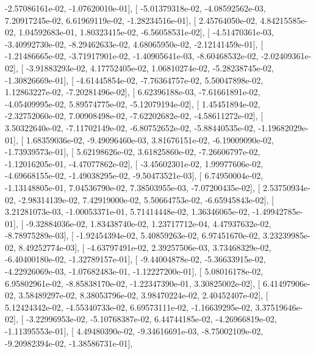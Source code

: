 \documentclass{article}
\begin{document}
         -2.57086161e-02,  -1.07620010e-01],
       [ -5.01379318e-02,  -4.08592562e-03,   7.20917245e-02,
          6.61969119e-02,  -1.28234516e-01],
       [  2.45764050e-02,   4.84215585e-02,   1.04592683e-01,
          1.80323415e-02,  -6.56058531e-02],
       [ -4.51470361e-03,  -3.40992730e-02,  -8.29462633e-02,
          4.68065950e-02,  -2.12141459e-01],
       [ -1.21486665e-02,  -3.71917901e-02,  -1.40905641e-03,
         -8.60468532e-02,  -2.02409361e-02],
       [ -3.91883293e-02,   4.17752405e-02,   1.06810274e-02,
         -5.28238745e-02,  -1.30826669e-01],
       [ -4.61445854e-02,  -7.76364757e-02,   5.50047898e-02,
          1.12863227e-02,  -7.20281496e-02],
       [  6.62396188e-03,  -7.61661891e-02,  -4.05409995e-02,
          5.89574775e-02,  -5.12079194e-02],
       [  1.45451894e-02,  -2.32752060e-02,   7.00908498e-02,
         -7.62202682e-02,  -4.58611272e-02],
       [  3.50322640e-02,  -7.11702149e-02,  -6.80752652e-02,
         -5.88440535e-02,  -1.19682029e-01],
       [  1.68359036e-02,  -9.49096460e-03,   3.81676151e-02,
         -6.19009090e-02,  -1.73939573e-01],
       [  5.62198626e-02,   3.61825860e-02,  -7.26606797e-02,
         -1.12016205e-01,  -4.47077862e-02],
       [ -3.45602301e-02,   1.99977606e-02,  -4.69668155e-02,
         -1.49038295e-02,  -9.50473521e-03],
       [  6.74950004e-02,  -1.13148805e-01,   7.04536790e-02,
          7.38503955e-03,  -7.07200435e-02],
       [  2.53750934e-02,  -2.98314139e-02,   7.42919000e-02,
          5.50664753e-02,  -6.65945843e-02],
       [  3.21281073e-03,  -1.00053371e-01,   5.71414448e-02,
          1.36346065e-02,  -1.49942785e-01],
       [ -9.32884036e-02,   1.83438740e-02,   1.23717712e-04,
          4.47937632e-02,  -8.78975289e-03],
       [ -1.92454394e-02,   5.40859263e-02,   6.97451670e-02,
          3.23239985e-02,   8.49252774e-03],
       [ -4.63797491e-02,   2.39257506e-03,   3.73468329e-02,
         -6.40400180e-02,  -1.32789157e-01],
       [ -9.44004878e-02,  -5.36633915e-02,  -4.22926069e-03,
         -1.07682483e-01,  -1.12227200e-01],
       [  5.08016178e-02,   6.95802961e-02,  -8.85838170e-02,
         -1.22347390e-01,   3.30825002e-02],
       [  6.41497906e-02,   3.58489297e-02,   8.38053796e-02,
          3.98470224e-02,   2.40452407e-02],
       [  5.12424342e-02,  -4.55340733e-02,   6.69573111e-02,
         -1.16639295e-02,   3.37519646e-02],
       [ -3.22996953e-02,  -5.10768387e-02,   6.44744185e-02,
         -4.26966819e-02,  -1.11395553e-01],
       [  4.49480390e-02,  -9.34616691e-03,  -8.75002109e-02,
         -9.20982394e-02,  -1.38586731e-01],
\end{document}
